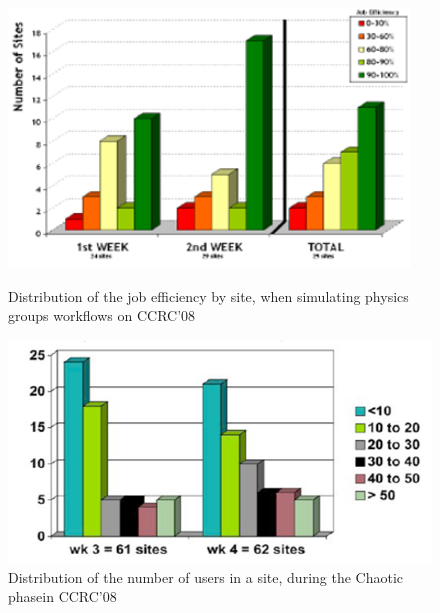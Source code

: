 \begin{figure}
\centering
\begin{minipage}{.45\textwidth}
\centering
\includegraphics[width=0.95\textwidth]{figures/CCRC08SiteEff.png}
\caption{Distribution of the job efficiency by site, when simulating physics
groups workflows on CCRC’08}
\label{fig:CCRC08SiteEff}
\end{minipage}
\begin{minipage}{.45\textwidth}
\centering
\includegraphics[width=1.\textwidth]{figures/CCRC08Chaotic.png}
\caption{Distribution of the number of users in a site, during the Chaotic phasein CCRC’08}
\label{fig:CCRC08Chaotic}
\end{minipage}
\end{figure}

